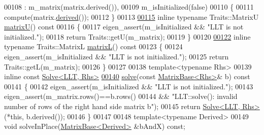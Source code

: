 \begin{DoxyCode}
00108       : m\_matrix(matrix.derived()),
00109         m\_isInitialized(false)
00110     \{
00111       compute(matrix.\hyperlink{group___core___module_a324b16961a11d2ecfd2d1b7dd7946545}{derived}());
00112     \}
00113 
\hyperlink{group___cholesky___module_a18a390f085567e650e8345cc7e7c0df8}{00115}     \textcolor{keyword}{inline} \textcolor{keyword}{typename} Traits::MatrixU \hyperlink{group___cholesky___module_a18a390f085567e650e8345cc7e7c0df8}{matrixU}()\textcolor{keyword}{ const}
00116 \textcolor{keyword}{    }\{
00117       eigen\_assert(m\_isInitialized && \textcolor{stringliteral}{"LLT is not initialized."});
00118       \textcolor{keywordflow}{return} Traits::getU(m\_matrix);
00119     \}
00120 
\hyperlink{group___cholesky___module_a7f4a3eedbf82e7ce2d6bf0dcd84cdfa3}{00122}     \textcolor{keyword}{inline} \textcolor{keyword}{typename} Traits::MatrixL \hyperlink{group___cholesky___module_a7f4a3eedbf82e7ce2d6bf0dcd84cdfa3}{matrixL}()\textcolor{keyword}{ const}
00123 \textcolor{keyword}{    }\{
00124       eigen\_assert(m\_isInitialized && \textcolor{stringliteral}{"LLT is not initialized."});
00125       \textcolor{keywordflow}{return} Traits::getL(m\_matrix);
00126     \}
00127 
00138     \textcolor{keyword}{template}<\textcolor{keyword}{typename} Rhs>
00139     \textcolor{keyword}{inline} \textcolor{keyword}{const} \hyperlink{group___core___module_class_eigen_1_1_solve}{Solve<LLT, Rhs>}
\hyperlink{group___cholesky___module_a3738bb3ce6f9b837a2beb432b937499f}{00140}     \hyperlink{group___cholesky___module_a3738bb3ce6f9b837a2beb432b937499f}{solve}(\textcolor{keyword}{const} \hyperlink{group___core___module_class_eigen_1_1_matrix_base}{MatrixBase<Rhs>}& b)\textcolor{keyword}{ const}
00141 \textcolor{keyword}{    }\{
00142       eigen\_assert(m\_isInitialized && \textcolor{stringliteral}{"LLT is not initialized."});
00143       eigen\_assert(m\_matrix.rows()==b.rows()
00144                 && \textcolor{stringliteral}{"LLT::solve(): invalid number of rows of the right hand side matrix b"});
00145       \textcolor{keywordflow}{return} \hyperlink{group___core___module_class_eigen_1_1_solve}{Solve<LLT, Rhs>}(*\textcolor{keyword}{this}, b.derived());
00146     \}
00147 
00148     \textcolor{keyword}{template}<\textcolor{keyword}{typename} Derived>
00149     \textcolor{keywordtype}{void} solveInPlace(\hyperlink{group___core___module_class_eigen_1_1_matrix_base}{MatrixBase<Derived>} &bAndX) \textcolor{keyword}{const};

\end{DoxyCode}
